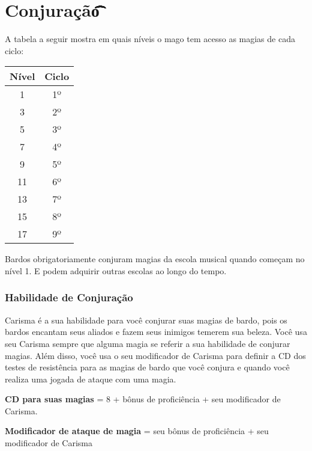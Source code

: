 \documentclass{RPG_Adventure}[2021/10/20]
\begin{document}
\section*{Conjuração\t\t\t\t\t\t\t\t\t\t\t}%
\label{sec:conjuracao}

A tabela a seguir mostra em quais níveis o mago tem acesso as magias de cada
ciclo:

\begin{center}
\begin{tabular}{|||c||c|||}
    \hline
    \textbf{Nível} & \textbf{Ciclo} \\
    \hline
    1 & 1º \\
    \hline
    3 & 2º \\
    \hline
    5 & 3º \\
    \hline
    7 & 4º \\
    \hline
    9 & 5º \\
    \hline
    11 & 6º \\
    \hline
    13 & 7º \\
    \hline
    15 & 8º \\
    \hline
    17 & 9º \\
    \hline
\end{tabular}
\end{center}

Bardos obrigatoriamente conjuram magias da escola musical quando começam no
nível 1. E podem adquirir outras escolas ao longo do tempo.

\subsubsection*{Habilidade de Conjuração}%
\label{ssub:habilidade_de_conjuracao}

Carisma é a sua habilidade para você conjurar suas magias de bardo, pois os
bardos encantam seus aliados e fazem seus inimigos temerem sua beleza.
Você usa seu Carisma sempre que alguma magia se referir a sua habilidade de
conjurar magias. Além disso, você usa o seu modificador de Carisma para definir
a CD dos testes de resistência para as magias de bardo que você conjura e
quando você realiza uma jogada de ataque com uma magia.

\begin{center}
\textbf{CD para suas magias} = 8 + bônus de proficiência + seu modificador de
Carisma. \nl

\textbf{Modificador de ataque de magia} = seu bônus de proficiência + seu
modificador de Carisma
\end{center}
\end{document}
